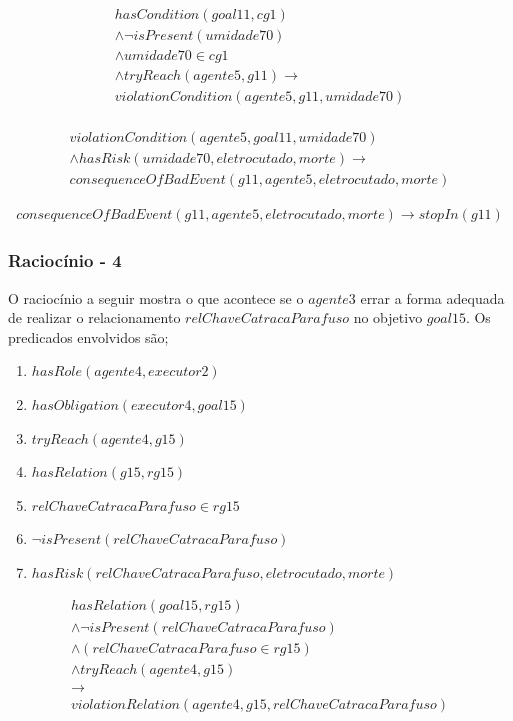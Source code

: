 \documentclass[12pt]{article}
\begin{document}
\begin{eqnarray}
	hasCondition(goal11,cg1) \nonumber \\ 
	\wedge \neg isPresent(umidade70) \nonumber \\
	\wedge umidade70 \in cg1 \nonumber \\
	\wedge tryReach(agente5,g11) \to \nonumber \\  
	violationCondition(agente5,g11,umidade70) \nonumber \\
\end{eqnarray}

\begin{eqnarray} \nonumber
	violationCondition(agente5,goal11,umidade70) \nonumber \\
	\wedge hasRisk(umidade70,eletrocutado,morte) \to \nonumber \\  
	consequenceOfBadEvent(g11,agente5,eletrocutado,morte)
\end{eqnarray}


\begin{eqnarray}
	consequenceOfBadEvent(g11,agente5,eletrocutado,morte) \to stopIn(g11)
\end{eqnarray}
\subsubsection{Raciocínio - 4} 

O raciocínio a seguir mostra o que acontece se o $agente3$ errar a forma adequada de realizar o relacionamento $relChaveCatracaParafuso$ no objetivo $goal15$. Os predicados envolvidos são;

\begin{enumerate}
	\item $hasRole(agente4,executor2)$
	\item $hasObligation(executor4,goal15)$	
	\item $tryReach(agente4,g15)$ 
	\item $hasRelation(g15,rg15)$
	\item $relChaveCatracaParafuso \in rg15$	
	\item $\neg isPresent(relChaveCatracaParafuso)$
	\item $hasRisk(relChaveCatracaParafuso,eletrocutado,morte)$
\end{enumerate}

\begin{eqnarray}
	hasRelation(goal15,rg15) \nonumber \\
	\wedge \neg isPresent(relChaveCatracaParafuso)  \nonumber \\ 
	\wedge (relChaveCatracaParafuso \in rg15) \nonumber \\
	\wedge tryReach(agente4,g15) \nonumber \\ 
	\to \nonumber \\ 
	violationRelation(agente4,g15,relChaveCatracaParafuso) \nonumber \\
\end{eqnarray}
\end{document}
